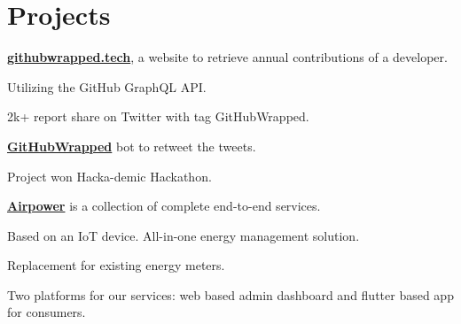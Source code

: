 \documentclass[]{deedy-resume-reversed}
\begin{document}
\begin{minipage}[t]{0.60\textwidth}


\section{Projects}
\descript{
}
\begin{tightemize}
\item \textbf{\href{https://githubwrapped.tech/}{githubwrapped.tech}}, a website to retrieve annual contributions of a developer.
\item Utilizing the GitHub GraphQL API.
\item 2k+ report share on Twitter with tag GitHubWrapped. 
\item\textbf{\href{https://twitter.com/GitHubWrapped}{GitHubWrapped}} bot to retweet the tweets.
\end{tightemize}
\sectionsep

\descript{}
\begin{tightemize}
\item Project won Hacka-demic Hackathon.
\item \textbf{\href{https://airpower.ishandeveloper.com/}{Airpower}} is a collection of complete end-to-end services. 
\item Based on an IoT device. All-in-one energy management solution.
\item Replacement for existing energy meters.
\item Two platforms for our services: web based admin dashboard and flutter based app for consumers.
\end{tightemize}
\sectionsep


\end{minipage}
\end{document}
